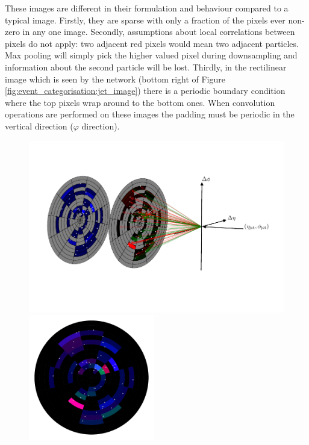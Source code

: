 These images are different in their formulation and behaviour compared to a typical image.
Firstly, they are sparse with only a fraction of the pixels ever non-zero in any one image. 
Secondly, assumptions about local correlations between pixels do not apply: two adjacent red pixels would mean two adjacent particles. Max pooling will simply pick the higher valued pixel during downsampling and information about the second particle will be lost. 
Thirdly, in the rectilinear image which is seen by the network (bottom right of Figure \ref{fig:event_categorisation:jet_image}) there is a periodic boundary condition where the top pixels wrap around to the bottom ones. When convolution operations are performed on these images the padding must be periodic in the vertical direction ($\varphi$ direction).

\newpage
\begin{figure}[h!]
    \includegraphics[width=\textwidth]{figures/event_selection/jet_diagram_RGB.pdf}
    \begin{center}
        \includegraphics[width=0.49\textwidth]{figures/event_selection/full_image_polar.pdf}

\end{center}
\end{figure}
